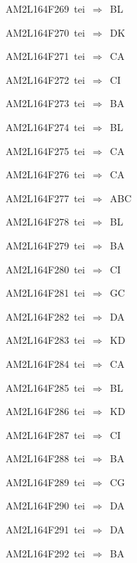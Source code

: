 {\sixrm AM2L164F269\ {\sixit tei}\ }$\Rightarrow$\ BL\par\smallskip
{\sixrm AM2L164F270\ {\sixit tei}\ }$\Rightarrow$\ DK\par\smallskip
{\sixrm AM2L164F271\ {\sixit tei}\ }$\Rightarrow$\ CA\par\smallskip
{\sixrm AM2L164F272\ {\sixit tei}\ }$\Rightarrow$\ CI\par\smallskip
{\sixrm AM2L164F273\ {\sixit tei}\ }$\Rightarrow$\ BA\par\smallskip
{\sixrm AM2L164F274\ {\sixit tei}\ }$\Rightarrow$\ BL\par\smallskip
{\sixrm AM2L164F275\ {\sixit tei}\ }$\Rightarrow$\ CA\par\smallskip
{\sixrm AM2L164F276\ {\sixit tei}\ }$\Rightarrow$\ CA\par\smallskip
{\sixrm AM2L164F277\ {\sixit tei}\ }$\Rightarrow$\ ABC\par\smallskip
{\sixrm AM2L164F278\ {\sixit tei}\ }$\Rightarrow$\ BL\par\smallskip
{\sixrm AM2L164F279\ {\sixit tei}\ }$\Rightarrow$\ BA\par\smallskip
{\sixrm AM2L164F280\ {\sixit tei}\ }$\Rightarrow$\ CI\par\smallskip
{\sixrm AM2L164F281\ {\sixit tei}\ }$\Rightarrow$\ GC\par\smallskip
{\sixrm AM2L164F282\ {\sixit tei}\ }$\Rightarrow$\ DA\par\smallskip
{\sixrm AM2L164F283\ {\sixit tei}\ }$\Rightarrow$\ KD\par\smallskip
{\sixrm AM2L164F284\ {\sixit tei}\ }$\Rightarrow$\ CA\par\smallskip
{\sixrm AM2L164F285\ {\sixit tei}\ }$\Rightarrow$\ BL\par\smallskip
{\sixrm AM2L164F286\ {\sixit tei}\ }$\Rightarrow$\ KD\par\smallskip
{\sixrm AM2L164F287\ {\sixit tei}\ }$\Rightarrow$\ CI\par\smallskip
{\sixrm AM2L164F288\ {\sixit tei}\ }$\Rightarrow$\ BA\par\smallskip
{\sixrm AM2L164F289\ {\sixit tei}\ }$\Rightarrow$\ CG\par\smallskip
{\sixrm AM2L164F290\ {\sixit tei}\ }$\Rightarrow$\ DA\par\smallskip
{\sixrm AM2L164F291\ {\sixit tei}\ }$\Rightarrow$\ DA\par\smallskip
{\sixrm AM2L164F292\ {\sixit tei}\ }$\Rightarrow$\ BA\par\smallskip

